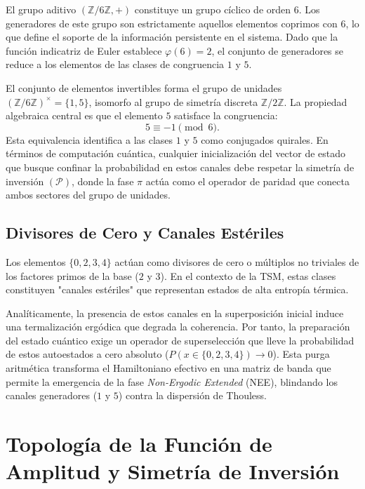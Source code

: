 \documentclass[12pt,a4paper]{article}
\theoremstyle{plain}
\theoremstyle{definition}
\theoremstyle{remark}
\begin{document}
El grupo aditivo $(\mathbb{Z}/6\mathbb{Z}, +)$ constituye un grupo cíclico de orden 6. Los generadores de este grupo son estrictamente aquellos elementos coprimos con 6, lo que define el soporte de la información persistente en el sistema. Dado que la función indicatriz de Euler establece $\varphi(6) = 2$, el conjunto de generadores se reduce a los elementos de las clases de congruencia $1$ y $5$.

El conjunto de elementos invertibles forma el grupo de unidades $(\mathbb{Z}/6\mathbb{Z})^{\times} = \{1,5\}$, isomorfo al grupo de simetría discreta $\mathbb{Z}/2\mathbb{Z}$. La propiedad algebraica central es que el elemento $5$ satisface la congruencia:
\begin{equation}
5 \equiv -1 \pmod{6}.
\label{eq:inverso_aditivo}
\end{equation}
Esta equivalencia identifica a las clases $1$ y $5$ como conjugados quirales. En términos de computación cuántica, cualquier inicialización del vector de estado que busque confinar la probabilidad en estos canales debe respetar la simetría de inversión $(\mathcal{P})$, donde la fase $\pi$ actúa como el operador de paridad que conecta ambos sectores del grupo de unidades.

\subsection{Divisores de Cero y Canales Estériles}

Los elementos $\{0, 2, 3, 4\}$ actúan como divisores de cero o múltiplos no triviales de los factores primos de la base ($2$ y $3$). En el contexto de la TSM, estas clases constituyen "canales estériles" que representan estados de alta entropía térmica. 

Analíticamente, la presencia de estos canales en la superposición inicial induce una termalización ergódica que degrada la coherencia. Por tanto, la preparación del estado cuántico exige un operador de superselección que lleve la probabilidad de estos autoestados a cero absoluto ($P(x \in \{0,2,3,4\}) \to 0$). Esta purga aritmética transforma el Hamiltoniano efectivo en una matriz de banda que permite la emergencia de la fase \textit{Non-Ergodic Extended} (NEE), blindando los canales generadores ($1$ y $5$) contra la dispersión de Thouless.

\section{Topología de la Función de Amplitud y Simetría de Inversión}
\end{document}
